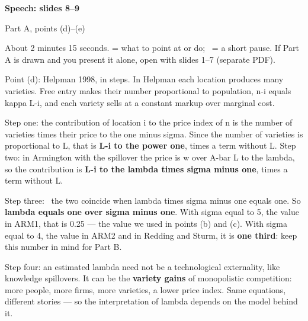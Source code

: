\newcommand{\speechpart}{Part A, slides 8--9}


{\color{unicablue}\Huge\bfseries Speech: slides 8--9\par}
\vspace{2pt}
{\Large Part A, points (d)--(e)\par}
\vspace{4pt}
{\small About 2 minutes 15 seconds.  = what to point at or do; \pause\ = a short pause. If Part A is drawn and you present it alone, open with slides 1--7 (separate PDF).}

\begin{say}
 Point (d): Helpman 1998, in steps. In Helpman each location produces many varieties. Free entry makes their number proportional to population, n-i equals kappa L-i, and each variety sells at a constant markup over marginal cost.

 Step one: the contribution of location i to the price index of n is the number of varieties times their price to the one minus sigma. Since the number of varieties is proportional to L, that is \textbf{L-i to the power one}, times a term without L. Step two: in Armington with the spillover the price is w over A-bar L to the lambda, so the contribution is \textbf{L-i to the lambda times sigma minus one}, times a term without L.

 Step three: \pause\ the two coincide when lambda times sigma minus one equals one. So \textbf{lambda equals one over sigma minus one}.  With sigma equal to 5, the value in ARM1, that is 0.25 --- the value we used in points (b) and (c). With sigma equal to 4, the value in ARM2 and in Redding and Sturm, it is \textbf{one third}: keep this number in mind for Part B.

 Step four: an estimated lambda need not be a technological externality, like knowledge spillovers. It can be the \textbf{variety gains} of monopolistic competition: more people, more firms, more varieties, a lower price index. Same equations, different stories --- so the interpretation of lambda depends on the model behind it.
\end{say}

